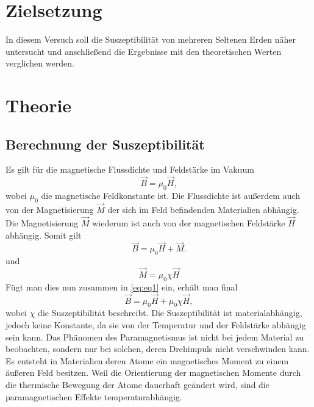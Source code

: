 \section{Zielsetzung}
\label{sec:Zielsetzung}

In diesem Versuch soll die Suszeptibilität von mehreren Seltenen Erden näher untersucht und anschließend die Ergebnisse mit den theoretischen Werten verglichen werden.

\section{Theorie}
\label{sec:Theorie}
\subsection{Berechnung der Suszeptibilität}
\label{subsec: Berechnung}
Es gilt für die magnetische Flussdichte und Feldstärke im Vakuum
\begin{equation}
\label{eq:eq1}
\vec{B} = \mu_0 \vec{H},
\end{equation}
wobei $\mu_0$ die magnetische Feldkonstante ist. Die Flussdichte ist außerdem auch von der Magnetisierung $\vec{M}$ der sich im Feld befindenden Materialien abhängig. Die Magnetisierung
$\vec{M}$ wiederum ist auch von der magnetischen Feldstärke $\vec{H}$ abhängig. Somit gilt
\begin{equation}
\label{eq:eq2}
\vec{B} = \mu_0 \vec{H} + \vec{M}.
\end{equation}
und
\begin{equation}
\vec{M} = \mu_0 \chi \vec{H}
\end{equation}
Fügt man dies nun zusammen in \autoref{eq:eq1} ein, erhält man final
\begin{equation*}
\vec{B} = \mu_0 \vec{H} + \mu_0 \chi \vec{H},
\end{equation*}
wobei $\chi$ die Suszeptibilität beschreibt. Die Suszeptibilität ist materialabhängig, jedoch keine Konstante, da sie von der Temperatur und der Feldstärke abhängig sein kann. 
\newline
Das Phänomen des Paramagnetismus ist nicht bei jedem Material zu beobachten, sondern nur bei solchen, deren Drehimpuls nicht verschwinden kann.
Es entsteht in Materialien deren Atome ein magnetisches Moment zu einem äußeren Feld besitzen. Weil die Orientierung der magnetischen Momente durch die thermische Bewegung
der Atome dauerhaft geändert wird, sind die paramagnetischen Effekte temperaturabhängig.
\newline
